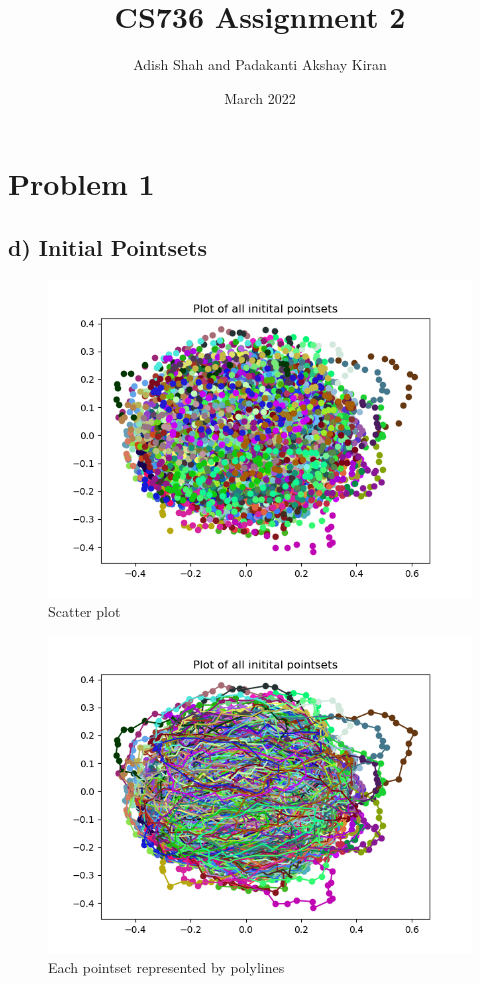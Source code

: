 \documentclass{article}
\begin{document}
\title{CS736 Assignment 2}
\author{Adish Shah and Padakanti Akshay Kiran}
\date{March 2022}
\maketitle
\thispagestyle{empty}
\tableofcontents
\newpage
\thispagestyle{fancy}




\section{Problem 1}
\subsection{d) Initial Pointsets}
\begin{figure}[H]
    \centerline{\includegraphics[scale=0.5]{../results/ellipses/initial-all-data-scatter.png}}
    \caption{Scatter plot}
\end{figure}

\begin{figure}[H]
    \centerline{\includegraphics[scale=0.5]{../results/ellipses/initial-all-data-polyline.png}}
    \caption{Each pointset represented by polylines}
\end{figure}
\end{document}
